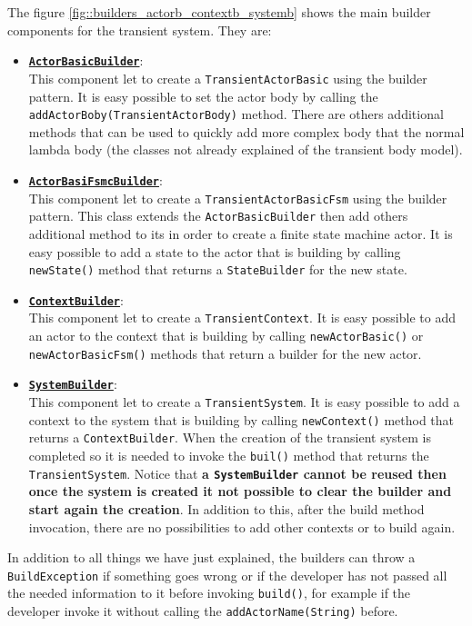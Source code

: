 The figure \ref{fig::builders_actorb_contextb_systemb} shows the main builder components for the transient system. They are:
\begin{itemize}
	\item 	\underline{\textbf{\texttt{ActorBasicBuilder}}}:\\
	This component let to create a \texttt{TransientActorBasic} using the builder pattern. It is easy possible to set the actor body by calling the \verb*|addActorBoby(TransientActorBody)| method. There are others additional methods that can be used to quickly add  more complex body that the normal lambda body (the classes not already explained of the transient body model).
	
	\item 	\underline{\textbf{\texttt{ActorBasiFsmcBuilder}}}:\\
	This component let to create a \texttt{TransientActorBasicFsm} using the builder pattern. This class extends the \texttt{ActorBasicBuilder} then add others additional method to its in order to create a finite state machine actor. It is easy possible to add a state to the actor that is building by calling \verb*|newState()| method that returns a \texttt{StateBuilder} for the new state.
	
	\item 	\underline{\textbf{\texttt{ContextBuilder}}}:\\
	This component let to create a \texttt{TransientContext}. It is easy possible to add an actor to the context that is building by calling \verb*|newActorBasic()| or \verb*|newActorBasicFsm()| methods that return a builder for the new actor.
	
	\item 	\underline{\textbf{\texttt{SystemBuilder}}}:\\
	This component let to create a \texttt{TransientSystem}. It is easy possible to add a context to the system that is building by calling \verb*|newContext()| method that returns a \texttt{ContextBuilder}. When the creation of the transient system is completed so it is needed to invoke the \verb*|buil()| method that returns the \texttt{TransientSystem}. Notice that \textbf{a \texttt{SystemBuilder} cannot be reused then once the system is created it not possible to clear the builder and start again the creation}. In addition to this, after the build method invocation, there are no possibilities to add other contexts or to build again.
\end{itemize}

In addition to all things we have just explained, the builders can throw a \texttt{BuildException} if something goes wrong or if the developer has not passed all the needed information to it before invoking \verb*|build()|, for example if the developer invoke it without calling the \verb*|addActorName(String)| before.

